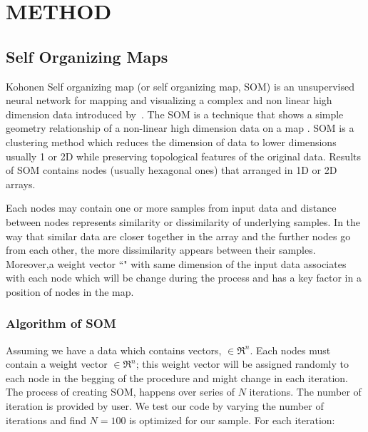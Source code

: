 
\section{METHOD}
 \subsection{Self Organizing Maps}
 
 Kohonen Self organizing map (or self organizing map, SOM) is an unsupervised neural network for mapping and visualizing a complex and non linear high dimension data introduced by~\citep{Kohonen82}. 
 The SOM is a technique that shows a simple geometry relationship of a non-linear high dimension data on a map \citep{Kohonen98}.
 SOM is a clustering method which reduces the dimension of data to lower dimensions usually 1 or 2D while preserving topological features of the original data.
 Results of SOM contains nodes (usually hexagonal ones) that arranged in 1D or 2D arrays.
 
  
 Each nodes may contain one or more samples from input data and distance between nodes represents similarity or dissimilarity of underlying samples. 
 In the way that similar data are closer together in the array and the further nodes go from each other, the more dissimilarity appears between their samples.
 Moreover,a weight vector ``" with same dimension of the input data associates with each node which will be change during the process and has a key factor in a position of nodes in the map. 
 
 \subsubsection{Algorithm of SOM} 

     Assuming we have a data which contains vectors,  $\in \Re^n$. Each nodes must contain a weight vector  $\in \Re^n$; this weight vector will be assigned randomly to each node in the begging of the procedure and might change in each iteration. The process of creating SOM, happens over series of $N$ iterations. The number of iteration is provided by user. We test our code by varying the number of iterations and find $N = 100$ is optimized for our sample. For each iteration:
   
